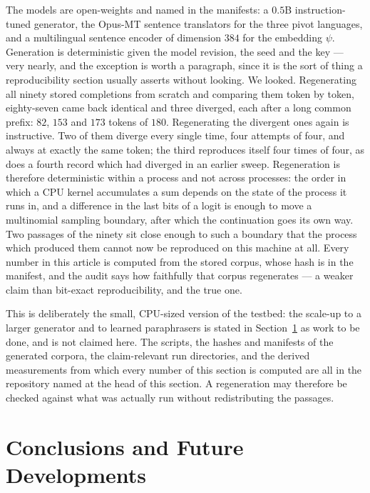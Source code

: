 \documentclass[11pt,a4paper]{article}
\theoremstyle{plain}
\theoremstyle{definition}
\numberwithin{equation}{section}
\begin{document}
The models are open-weights and named in the manifests: a $0.5$B
instruction-tuned generator, the Opus-MT sentence translators for the
three pivot languages, and a multilingual sentence encoder of dimension
$384$ for the embedding $\psi$. Generation is deterministic given the
model revision, the seed and the key --- very nearly, and the exception
is worth a paragraph, since it is the sort of thing a reproducibility
section usually asserts without looking. We looked. Regenerating all
ninety stored completions from scratch and comparing them token by
token, eighty-seven came back identical and three diverged, each after a
long common prefix: $82$, $153$ and $173$ tokens of $180$. Regenerating
the divergent ones again is instructive. Two of them diverge every
single time, four attempts of four, and always at exactly the same
token; the third reproduces itself four times of four, as does a fourth
record which had diverged in an earlier sweep. Regeneration is therefore
deterministic within a process and not across processes: the order in
which a CPU kernel accumulates a sum depends on the state of the process
it runs in, and a difference in the last bits of a logit is enough to
move a multinomial sampling boundary, after which the continuation goes
its own way. Two passages of the ninety sit close enough to such a
boundary that the process which produced them cannot now be reproduced
on this machine at all. Every number in this article is computed from
the stored corpus, whose hash is in the manifest, and the audit says how
faithfully that corpus regenerates --- a weaker claim than bit-exact
reproducibility, and the true one.

This is deliberately the small, CPU-sized version of the testbed: the
scale-up to a larger generator and to learned paraphrasers is stated in
Section~\ref{sec:conclusions} as work to be done, and is not claimed
here. The scripts, the hashes and manifests of the generated corpora,
the claim-relevant run directories, and the derived measurements from
which every number of this section is computed are all in the repository
named at the head of this section. A regeneration may therefore be
checked against what was actually run without redistributing the passages.

\section{Conclusions and Future Developments}\label{sec:conclusions}
\end{document}
